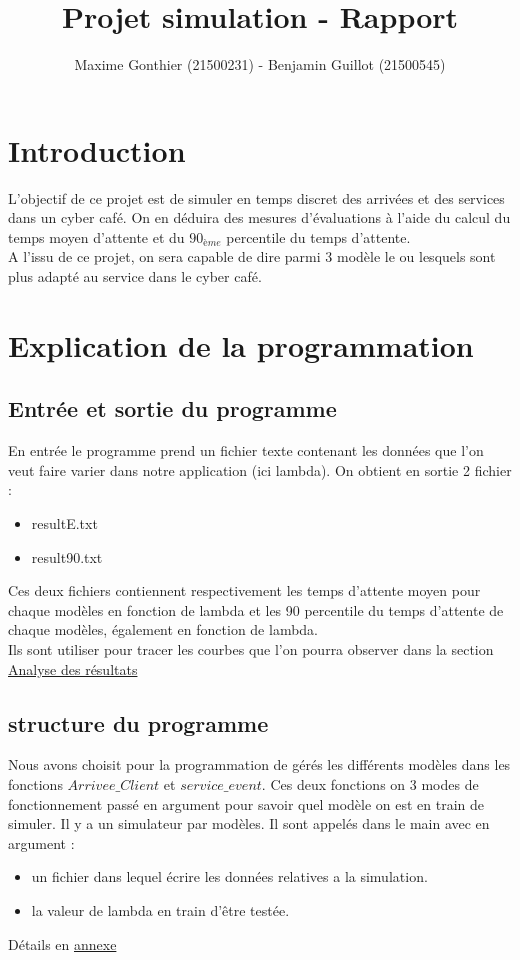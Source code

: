 \documentclass[a4paper,11pt]{article}
\title{Projet simulation - Rapport}
\author{Maxime Gonthier (21500231) - Benjamin Guillot (21500545)}
\begin{document}
\clearpage
\maketitle

\newpage
\tableofcontents

\newpage
\section{Introduction}
	L'objectif de ce projet est de simuler en temps discret des arrivées et des services dans un cyber café. On en déduira des mesures d'évaluations à l'aide du calcul du temps moyen d'attente et du $90_{ème}$ percentile du temps d'attente.\\
	A l'issu de ce projet, on sera capable de dire parmi 3 modèle le ou lesquels sont plus adapté au service dans le cyber café.
\newpage
\section{Explication de la programmation}
	\subsection{Entrée et sortie du programme}
	En entrée le programme prend un fichier texte contenant les données que l'on veut faire varier dans notre application (ici lambda).
	On obtient en sortie 2 fichier :
	\begin{itemize}
		\item resultE.txt
		\item result90.txt
	\end{itemize}
	Ces deux fichiers contiennent respectivement les temps d'attente moyen pour chaque modèles en fonction de lambda et les 90 percentile du temps d'attente de chaque modèles, également en fonction de lambda.\\
	Ils sont utiliser pour tracer les courbes que l'on pourra observer dans la section \hyperref[Analyse des résultats]{Analyse des résultats}
	\subsection{structure du programme}
	Nous avons choisit pour la programmation de gérés les différents modèles dans les fonctions $Arrivee\_Client$ et $service\_event$. Ces deux fonctions on 3 modes de fonctionnement
	passé en argument pour savoir quel modèle on est en train de simuler. Il y a un simulateur par modèles.
	Il sont appelés dans le main avec en argument :
	\begin{itemize}
		\item un fichier dans lequel écrire les données relatives a la simulation.
		\item la valeur de lambda en train d'être testée.
	\end{itemize}
	Détails en \hyperref[annexe]{annexe}
\end{document}

